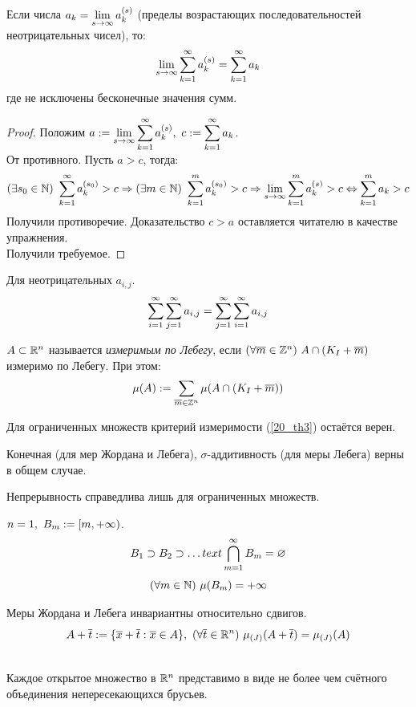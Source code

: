 \begin{lemma}\label{21_l5}
	Если числа $a_k=\lim_{s\ra\i}a_k^{(s)}$ (пределы возрастающих последовательностей неотрицательных чисел), то:
	\[\lim_{s\ra\i}\sum_{k=1}^\i a_k^{(s)}=\sum_{k=1}^\i a_k\]
	где не исключены бесконечные значения сумм.
\end{lemma}
\begin{proof}
	Положим $\ds a:=\lim_{s\ra\i}\sum_{k=1}^\i a_k^{(s)},\ c:=\sum_{k=1}^\i a_k$.\\
	От противного. Пусть $a>c$, тогда:
	\[(\ex s_0\in\N)\ \sum_{k=1}^\i a_k^{(s_0)}>c\Ra(\ex m\in\N)\ \sum_{k=1}^ma_k^{(s_0)}>c\Ra\lim_{s\ra\i}\sum_{k=1}^ma_k^{(s)}>c\lra\sum_{k=1}^ma_k>c\]
	Получили противоречие. Доказательство $c>a$ оставляется читателю в качестве упражнения.\\
	Получили требуемое.
\end{proof}
\begin{corollary}
	Для неотрицательных $a_{i,j}$.
	\[\sum_{i=1}^\i\sum_{j=1}^\i a_{i,j}=\sum_{j=1}^\i\sum_{i=1}^\i a_{i,j}\]
\end{corollary}
\begin{definition}
	$A\subset \mathbb{R}^n$ называется \textit{измеримым по Лебегу}, если $(\forall\overline m\in\mathbb{Z}^n)\ A\cap(K_I+\overline m)$ измеримо по Лебегу. При этом:
	\[\mu(A):=\sum_{\v m\in\Z^n}\mu(A\cap(K_I+\v m))\]
\end{definition}
\begin{note}
	Для ограниченных множеств критерий измеримости (\ref{20_th3}) остаётся верен.
\end{note}
\begin{note}
	Конечная (для мер Жордана и Лебега), $\sigma$-аддитивность (для меры Лебега) верны в общем случае.
\end{note}
\begin{note}
	Непрерывность справедлива лишь для ограниченных множеств.
\end{note}
\begin{example}
	$n=1,\ B_m:=[m,+\infty)$.
	\[B_1\supset B_2\supset\dots\\text{ }\bigcap_{m=1}^\infty B_m=\varnothing\]
	\[(\forall m\in\mathbb{N})\ \mu(B_m)=+\infty\]
\end{example}
\begin{theorem}
	Меры Жордана и Лебега инвариантны относительно сдвигов.
	\[A+\overline t:=\{\overline x+\overline t:\overline x\in A\},\ (\forall \overline t\in\mathbb{R}^n)\ \mu_{(J)}(A+\overline t)=\mu_{(J)}(A)\]
\end{theorem}
\begin{theorem}\label{22_th7}\\
	Каждое открытое множество в $\mathbb{R}^n$ представимо в виде не более чем счётного объединения непересекающихся брусьев.
\end{theorem}
